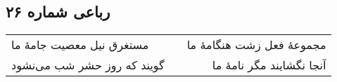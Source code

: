 \begin{center}
\section*{رباعی شماره ۲۶}
\label{sec:sh026}
\begin{longtable}{l p{0.5cm} r}
مستغرق نیل معصیت جامهٔ ما
&&
مجموعهٔ فعل زشت هنگامهٔ ما
\\
گویند که روز حشر شب می‌نشود
&&
آنجا نگشایند مگر نامهٔ ما
\\
\end{longtable}
\end{center}
